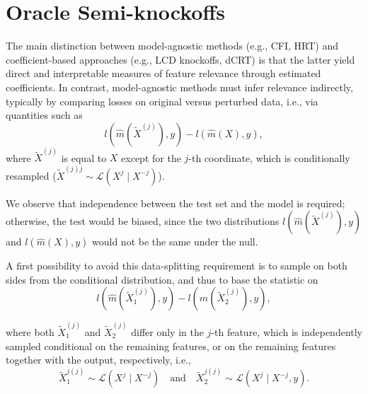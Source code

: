 \documentclass{article}
\theoremstyle{plain}
\theoremstyle{definition}
\theoremstyle{remark}
\begin{document}
\section{Oracle Semi-knockoffs}
 The main distinction between model-agnostic methods (e.g., CFI, HRT) and coefficient-based approaches (e.g., LCD knockoffs, dCRT) is that the latter yield direct and interpretable measures of feature relevance through estimated coefficients. 
 In contrast, model-agnostic methods must infer relevance indirectly, typically by comparing losses on original versus perturbed data, i.e., via quantities such as
\[
l(\widehat{m}(\widetilde{X}^{(j)}), y) - l(\widehat{m}(X), y),
\]
where $\widetilde{X}^{(j)}$ is equal to $X$ except for the $j$-th coordinate, which is conditionally resampled ($\widetilde{X}^{(j)j}\sim \mathcal{L}(X^j\mid X^{-j})$).  

We observe that independence between the test set and the model is required; otherwise, the test would be biased, since the two distributions $l(\widehat{m}(\widetilde{X}^{(j)}), y)$ and $l(\widehat{m}(X), y)$ would not be the same under the null.  

A first possibility to avoid this data-splitting requirement is to sample on both sides from the conditional distribution, and thus to base the statistic on
\[
l(\widehat{m}(\widetilde{X}_1^{(j)}), y) - l(\widehat{m}(\widetilde{X}_2^{(j)}), y),
\]

where both $\widetilde{X}_1^{(j)}$ and $\widetilde{X}_2^{(j)}$ differ only in the $j$-th feature, which is independently sampled conditional on the remaining features, or on the remaining features together with the output, respectively, i.e.,
\[
\widetilde{X}_1^{j(j)}\sim \mathcal{L}(X^j \mid X^{-j})
\quad\text{and}\quad 
\widetilde{X}_2^{j(j)}\sim\mathcal{L}(X^j \mid X^{-j}, y).
\]
\end{document}
